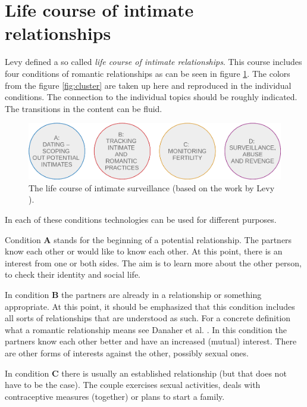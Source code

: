 \section{Life course of intimate relationships}
\label{sec:life_course}
Levy \cite{levy2014intimate} defined a so called \textit{life course of intimate relationships}. This course includes four conditions of romantic relationships as can be seen in figure \ref{fig:live_course}. The colors from the figure \ref{fig:cluster} are taken up here and reproduced in the individual conditions. The connection to the individual topics should be roughly indicated. The transitions in the content can be fluid.
\begin{figure}[htb]
    \centering
	\includegraphics[width=\linewidth]{img/life_course.png}
	\caption{The life course of intimate surveillance (based on the work by Levy \cite{levy2014intimate}).}
	\label{fig:live_course}
\end{figure}

In each of these conditions technologies can be used for different purposes.

Condition \textbf{A} stands for the beginning of a potential relationship. The partners know each other or would like to know each other. At this point, there is an interest from one or both sides. The aim is to learn more about the other person, to check their identity and social life.

In condition \textbf{B} the partners are already in a relationship or something appropriate. At this point, it should be emphasized that this condition includes all sorts of relationships that are understood as such. For a concrete definition what a romantic relationship means see Danaher et al. \cite{doi:10.1080/15265161.2017.1409823}. In this condition the partners know each other better and have an increased (mutual) interest. There are other forms of interests against the other, possibly sexual ones.

In condition \textbf{C} there is usually an established relationship (but that does not have to be the case). The couple exercises sexual activities, deals with contraceptive measures (together) or plans to start a family.

